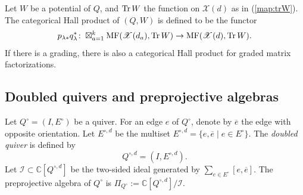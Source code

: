 \documentclass [11pt,oneside,a4paper,mathscr]{amsart}
\theoremstyle{definition}
\renewcommand{\leq}{\leqslant}
\newcommand{\X}{\mathscr{X}}
\newcommand{\dd}{\underline{d}}
\newcommand{\Tr}{\mathop{\rm Tr}}
\begin{document}
Let $W$ be a potential of $Q$, and $\Tr W$
the function on $\X(d)$ as in (\ref{map:trW}). 
The categorical Hall product of $(Q, W)$ is defined to 
be the functor 
\begin{align}\label{def:Hallprod2}
    p_{\lambda*}q_\lambda^{\ast} \colon \boxtimes_{a=1}^k \mathrm{MF}(\mathscr{X}(d_a), \Tr W) \to \mathrm{MF}(\mathscr{X}(d), \Tr W). 
\end{align}
If there is a grading, there is also
a categorical Hall product for graded matrix 
factorizations. 



\subsection{Doubled quivers and preprojective algebras}\label{subsec26}



Let $Q^\circ=(I, E^\circ)$ be a quiver. For an edge $e$ of $Q^{\circ}$, denote by $\overline{e}$ the edge with opposite orientation.
Let $E^{\circ, d}$ be the multiset $E^{\circ, d}=\{e, \overline{e} \mid e\in E^{\circ}\}$. 
The \textit{doubled quiver}
is defined by \[Q^{\circ, d}=(I, E^{\circ, d}).\] 
Let $\mathscr{I}\subset \mathbb{C}[Q^{\circ, d}]$ be the two-sided ideal generated by $\sum_{e\in E^\circ}[e, \overline{e}]$.
The preprojective algebra of $Q^\circ$ is $\Pi_{Q^\circ}:=\mathbb{C}[Q^{\circ, d}]/\mathscr{I}$.
\end{document}
